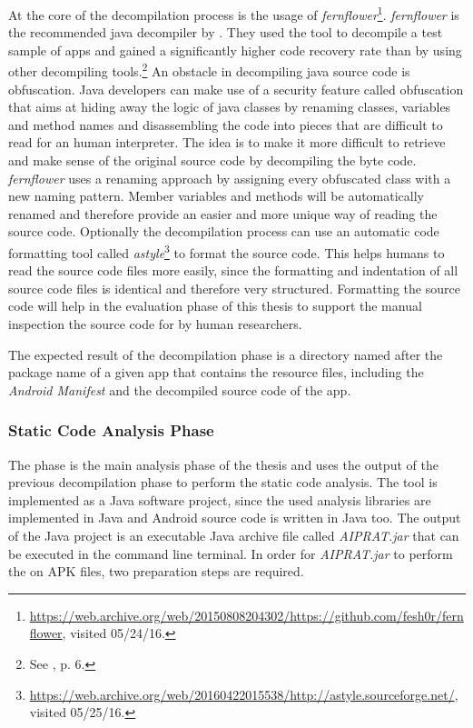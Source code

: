 At the core of the decompilation process is the usage of \textit{fernflower}\footnote{\url{https://web.archive.org/web/20150808204302/https://github.com/fesh0r/fernflower}, visited 05/24/16.}.
\textit{fernflower} is the recommended java decompiler by \cite{Enck2011}. 
They used the tool to decompile a test sample of apps and gained a significantly higher code recovery rate than by using other decompiling tools.\footnote{See \cite{Enck2011}, p. 6.}
An obstacle in decompiling java source code is obfuscation. 
Java developers can make use of a security feature called obfuscation that aims at hiding away the logic of java classes by renaming classes, variables and method names and disassembling the code into pieces that are difficult to read for an human interpreter.
The idea is to make it more difficult to retrieve and make sense of the original source code by decompiling the byte code.
\textit{fernflower} uses a renaming approach by assigning every obfuscated class with a new naming pattern. 
Member variables and methods will be automatically renamed and therefore provide an easier and more unique way of reading the source code.
Optionally the decompilation process can use an automatic code formatting tool called \textit{astyle}\footnote{\url{https://web.archive.org/web/20160422015538/http://astyle.sourceforge.net/}, visited 05/25/16.} to format the source code.
This helps humans to read the source code files more easily, since the formatting and indentation of all source code files is identical and therefore very structured.
Formatting the source code will help in the evaluation phase of this thesis to support the manual inspection the source code for \ipr by human researchers.

The expected result of the decompilation phase is a directory named after the package name of a given app that contains the resource files, including the \textit{Android Manifest} and the decompiled source code of the app.

\subsubsection{Static Code Analysis Phase} \label{sssec:SCAP}

The \sca phase is the main analysis phase of the thesis and uses the output of the previous decompilation phase to perform the static code analysis.
The \sca tool is implemented as a Java software project, since the used analysis libraries are implemented in Java and Android source code is written in Java too.
The output of the \sca Java project is an executable Java archive file called \textit{AIPRAT.jar} that can be executed in the command line terminal.
In order for \textit{AIPRAT.jar} to perform the \sca on APK files, two preparation steps are required.

